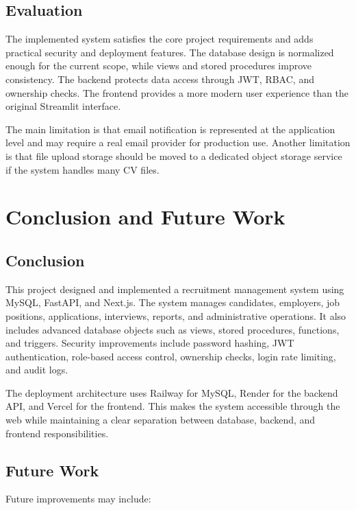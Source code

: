 \documentclass[11pt,a4paper]{report}
\begin{document}
\section{Evaluation}

The implemented system satisfies the core project requirements and adds practical security and deployment features. The database design is normalized enough for the current scope, while views and stored procedures improve consistency. The backend protects data access through JWT, RBAC, and ownership checks. The frontend provides a more modern user experience than the original Streamlit interface.

The main limitation is that email notification is represented at the application level and may require a real email provider for production use. Another limitation is that file upload storage should be moved to a dedicated object storage service if the system handles many CV files.

\chapter{Conclusion and Future Work}

\section{Conclusion}

This project designed and implemented a recruitment management system using MySQL, FastAPI, and Next.js. The system manages candidates, employers, job positions, applications, interviews, reports, and administrative operations. It also includes advanced database objects such as views, stored procedures, functions, and triggers. Security improvements include password hashing, JWT authentication, role-based access control, ownership checks, login rate limiting, and audit logs.

The deployment architecture uses Railway for MySQL, Render for the backend API, and Vercel for the frontend. This makes the system accessible through the web while maintaining a clear separation between database, backend, and frontend responsibilities.

\section{Future Work}

Future improvements may include:
\end{document}
